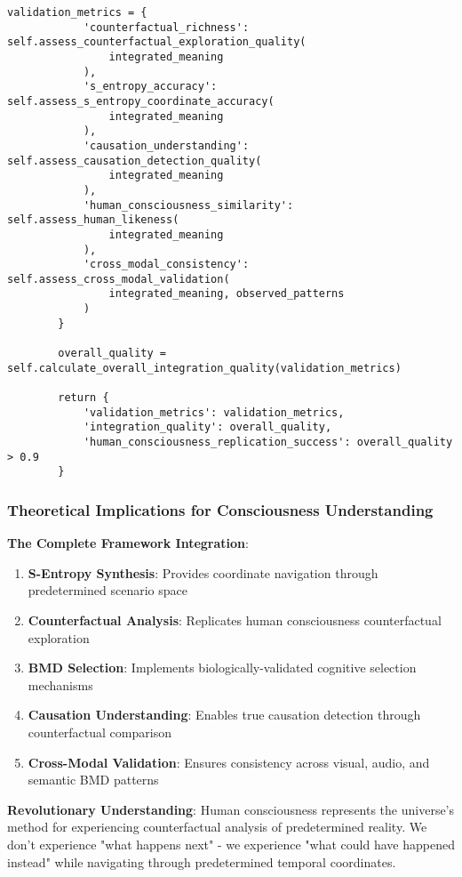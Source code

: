 \documentclass[12pt,a4paper]{article}
\begin{document}
\begin{lstlisting}[style=pythonstyle, caption=Integrated Counterfactual S-Entropy BMD Dictionary]
        validation_metrics = {
            'counterfactual_richness': self.assess_counterfactual_exploration_quality(
                integrated_meaning
            ),
            's_entropy_accuracy': self.assess_s_entropy_coordinate_accuracy(
                integrated_meaning
            ),
            'causation_understanding': self.assess_causation_detection_quality(
                integrated_meaning
            ),
            'human_consciousness_similarity': self.assess_human_likeness(
                integrated_meaning
            ),
            'cross_modal_consistency': self.assess_cross_modal_validation(
                integrated_meaning, observed_patterns
            )
        }
        
        overall_quality = self.calculate_overall_integration_quality(validation_metrics)
        
        return {
            'validation_metrics': validation_metrics,
            'integration_quality': overall_quality,
            'human_consciousness_replication_success': overall_quality > 0.9
        }
\end{lstlisting}

\subsubsection{Theoretical Implications for Consciousness Understanding}

\textbf{The Complete Framework Integration}:

\begin{enumerate}
\item \textbf{S-Entropy Synthesis}: Provides coordinate navigation through predetermined scenario space
\item \textbf{Counterfactual Analysis}: Replicates human consciousness counterfactual exploration
\item \textbf{BMD Selection}: Implements biologically-validated cognitive selection mechanisms
\item \textbf{Causation Understanding}: Enables true causation detection through counterfactual comparison
\item \textbf{Cross-Modal Validation}: Ensures consistency across visual, audio, and semantic BMD patterns
\end{enumerate}

\textbf{Revolutionary Understanding}: Human consciousness represents the universe's method for experiencing counterfactual analysis of predetermined reality. We don't experience "what happens next" - we experience "what could have happened instead" while navigating through predetermined temporal coordinates.
\end{document}
